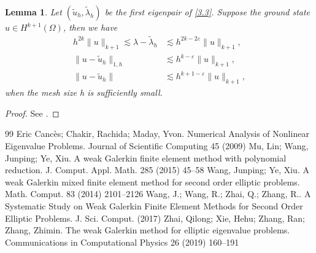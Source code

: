 \documentclass[10pt,a4paper]{amsart}
\numberwithin{equation}{section}
\newtheorem{lemma}{Lemma}[section]
\newcommand{\eps}{\varepsilon}
\begin{document}
\begin{lemma}\label{lem7}
	Let $(\widetilde{u}_h,\widetilde{\lambda}_h)$ be the first eigenpair of \eqref{3.3}. Suppose the ground state $u\in H^{k+1}(\Omega)$, then we have
	\begin{eqnarray}
		h^{2k}\|u\|_{k+1}\lesssim\lambda-\widetilde{\lambda}_h&\lesssim h^{2k-2\eps}\|u\|_{k+1},\label{3.4}
		\\
		\|u-\widetilde{u}_h\|_{1,h}&\lesssim h^{k-\eps}\|u\|_{k+1},\label{3.5}
		\\
		\|u-\widetilde{u}_h\|&\lesssim h^{k+1-\eps}\|u\|_{k+1},\label{3.6}
	\end{eqnarray}
	when the mesh size h is sufficiently small.
\end{lemma}

\begin{proof}
	See \cite{Zhai2019c}.
\end{proof}


\begin{thebibliography}{99}
 Eric Cancès; Chakir, Rachida; Maday, Yvon. Numerical Analysis of Nonlinear Eigenvalue Problems. Journal of Scientific Computing 45 (2009)
 Mu, Lin; Wang, Junping; Ye, Xiu. A weak Galerkin finite element method with polynomial reduction. J. Comput. Appl. Math. 285 (2015) 45--58
 Wang, Junping; Ye, Xiu. A weak Galerkin mixed finite element method for second order elliptic problems. Math. Comput. 83 (2014) 2101--2126
 Wang, J.; Wang, R.; Zhai, Q.; Zhang, R.. A Systematic Study on Weak Galerkin Finite Element Methods for Second Order Elliptic Problems. J. Sci. Comput. (2017)
 Zhai, Qilong; Xie, Hehu; Zhang, Ran; Zhang, Zhimin. The weak Galerkin method for elliptic eigenvalue problems. Communications in Computational Physics 26 (2019) 160--191
\end{thebibliography}
\end{document}
